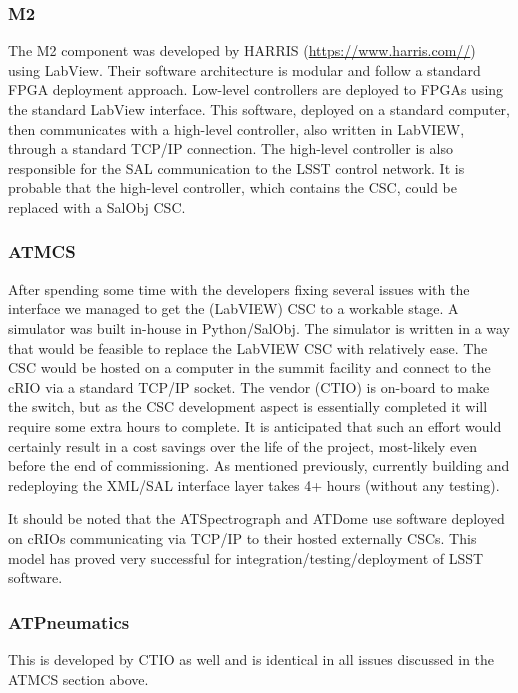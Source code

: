 \documentclass[TS,authoryear,toc]{lsstdoc}
\begin{document}
\subsubsection{M2}
The M2 component was developed by HARRIS (\url{https://www.harris.com//}) using LabView. Their software architecture is modular and follow a standard FPGA deployment approach. Low-level controllers are deployed to FPGAs using the standard LabView interface. This software, deployed on a standard computer, then communicates with a high-level controller, also written in LabVIEW, through a standard TCP/IP connection. The high-level controller is also responsible for the SAL communication to the LSST control network. It is probable that the high-level controller, which contains the CSC, could be replaced with a SalObj CSC.

\subsubsection{ATMCS}
After spending some time with the developers fixing several issues with the interface we managed to get the (LabVIEW) CSC to a workable stage. A simulator was built in-house in Python/SalObj. The simulator is written in a way that would be feasible to replace the LabVIEW CSC with relatively ease. The CSC would be hosted on a computer in the summit facility and connect to the cRIO via a standard TCP/IP socket. The vendor (CTIO) is on-board to make the switch, but as the CSC development aspect is essentially completed it will require some extra hours to complete. It is anticipated that such an effort would certainly result in a cost savings over the life of the project, most-likely even before the end of commissioning. As mentioned previously, currently building and redeploying the XML/SAL interface layer takes 4+ hours (without any testing).

It should be noted that the ATSpectrograph and ATDome use software deployed on cRIOs communicating via TCP/IP to their hosted externally CSCs. This model has proved very successful for integration/testing/deployment of LSST software. 

\subsubsection{ATPneumatics}
This is developed by CTIO as well and is identical in all issues discussed in the ATMCS section above.
\end{document}
